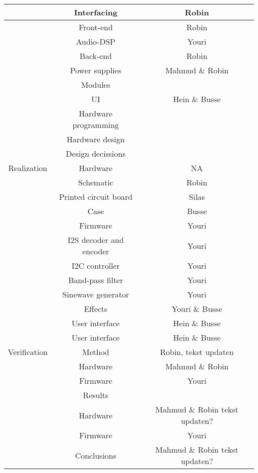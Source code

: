\begin{justify}
\begin{table}[!h]
\begin{tabular}{|c|c|c|}
							& Interfacing					& Robin				\\ \hline
							& Front-end						& Robin				\\ \hline
							& Audio-DSP						& Youri				\\ \hline
							& Back-end						& Robin				\\ \hline
							& Power supplies				& Mahmud \& Robin	\\ \hline
							& Modules						& 					\\ \hline
							& UI							& Hein \& Busse		\\ \hline
							& Hardware programming			& 					\\ \hline
							& Hardware design				& 					\\ \hline
							& Design decissions				& 					\\ \hline
Realization					& Hardware						& NA				\\ \hline
							& Schematic						& Robin				\\ \hline
							& Printed circuit board			& Silas				\\ \hline
							& Case							& Busse				\\ \hline
							& Firmware						& Youri				\\ \hline
							& I2S decoder and encoder		& Youri				\\ \hline
							& I2C controller				& Youri				\\ \hline
							& Band-pass filter				& Youri				\\ \hline
							& Sinewave generator			& Youri				\\ \hline
							& Effects						& Youri \& Busse	\\ \hline
							& User interface				& Hein \& Busse		\\ \hline
							& User interface				& Hein \& Busse		\\ \hline
Verification				& Method						& Robin, tekst updaten					\\ \hline
							& Hardware						& Mahmud \& Robin	\\ \hline
							& Firmware						& Youri				\\ \hline
							& Results						& 					\\ \hline
							& Hardware						& Mahmud \& Robin tekst updaten?					\\ \hline
							& Firmware						& Youri					\\ \hline
							& Conclusions					& Mahmud \& Robin tekst updaten?					\\ \hline

\end{tabular}
\end{table}
\end{justify}
